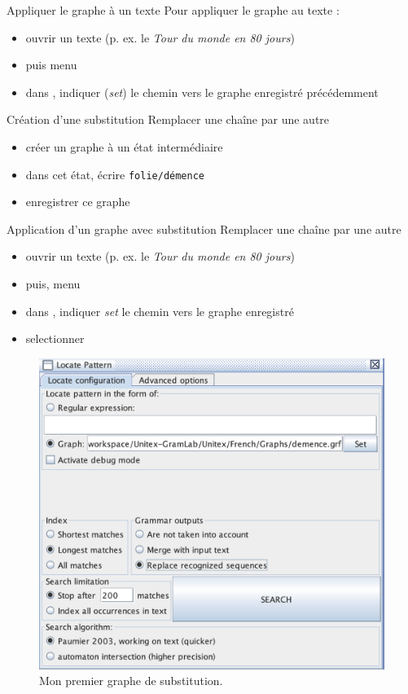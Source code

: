 \documentclass[xetex,xcolor={table,usenames,dvipsnames}]{beamer}
\begin{document}
\begin{frame}{Appliquer le graphe à un texte}
	Pour appliquer le graphe au texte : 
	\begin{itemize}
		\item ouvrir un texte (p. ex. le \textit{Tour du monde en 80 jours})
		\item puis menu 
		\item dans , indiquer (\textit{set}) le chemin vers le graphe enregistré précédemment
	\end{itemize}
\end{frame}

\begin{frame}{Création d'une substitution}
	\textcolor{deepblue}{Remplacer une chaîne par une autre}
	\begin{itemize}
		\item créer un graphe à un état intermédiaire
		\item dans cet état, écrire \texttt{folie/démence}
		\item enregistrer ce graphe
	\end{itemize}
\end{frame}

\begin{frame}{Application d'un graphe avec substitution}
	\textcolor{deepblue}{Remplacer une chaîne par une autre}
	\begin{itemize}
		\item ouvrir un texte (p. ex. le \textit{Tour du monde en 80 jours})
		\item puis, menu 
		\item dans , indiquer \textit{set} le chemin vers le graphe enregistré
		\item selectionner 
	\end{itemize}
				\begin{figure}[h] %
		\centering
		\includegraphics[width=.3\linewidth]{img/substitution.png}
		\caption{Mon premier graphe de substitution.}
		\label{fig:ling_out_TAL}
	\end{figure}
\end{frame}
\end{document}

